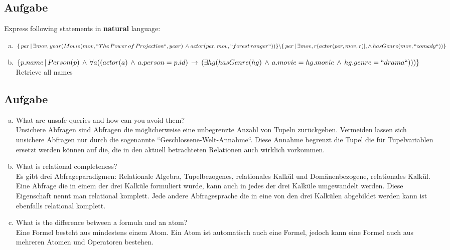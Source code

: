 \documentclass[11pt,a4paper,DIV=9]{scrartcl}
\newcounter{temp}
\newcommand{\aufgabe}[1]{
  \setcounter{temp}{\value{subsection}}
  \setcounter{subsection}{#1}
  \addtocounter{subsection}{-1}
  \subsection{Aufgabe}
  \setcounter{subsection}{\value{temp}}
}
\begin{document}
\aufgabe{2}
Express following statements in \textbf{natural} language:
 \begin{enumerate}[a)]
   \item 
   $ 
   \{\, per \, | \, \exists mov, year (\\ 
   Movie(mov, ``The \, Power \, of \, Projection``, year) \,  \wedge \, \\actor(per,mov, ``forest \, ranger``)\\ 
   ) \} \backslash \{ \,per \, | \, \exists mov, r(actor(per, mov, r) |, \wedge \, hasGenre(mov, ``comedy``))\}
   $
   \item 
   $
   \{p.name \, | \, Person(p) \, \wedge \, \forall a(\\  
   (actor(a) \, \wedge \, a.person=p.id) \, \rightarrow \, (\\
   \exists hg(hasGenre(hg) \, \wedge \, a.movie=hg.movie \, \wedge \, hg.genre=``drama``)
   \\)\\)\}
   $
   Retrieve all names
 \end{enumerate}
\aufgabe{3}
\begin{enumerate}[a)]
 \item What are unsafe queries and how can you avoid them? \\
 Unsichere Abfragen sind Abfragen die m\"oglicherweise eine unbegrenzte Anzahl von Tupeln zur\"uckgeben. Vermeiden lassen sich unsichere Abfragen nur durch die sogenannte ``Geschlossene-Welt-Annahme``. Diese Annahme begrenzt die Tupel die f\"ur Tupelvariablen ersetzt werden k\"onnen auf die, die in den aktuell betrachteten Relationen auch wirklich vorkommen.
 \item What is relational completeness? \\
 Es gibt drei Abfrageparadigmen: Relationale Algebra, Tupelbezogenes, relationales Kalk\"ul und Dom\"anenbezogene, relationales Kalk\"ul. Eine Abfrage die in einem der drei Kalk\"ule formuliert wurde, kann auch in jedes der drei Kalk\"ule umgewandelt werden. Diese Eigenschaft nennt man relational komplett. Jede andere Abfragesprache die in eine von den drei Kalk\"ulen abgebildet werden kann ist ebenfalls relational komplett.
 \item What is the difference between a formula and an atom? \\
 Eine Formel besteht aus mindestens einem Atom. Ein Atom ist automatisch auch eine Formel, jedoch kann eine Formel auch aus mehreren Atomen und Operatoren bestehen.
\end{enumerate}
\end{document}
